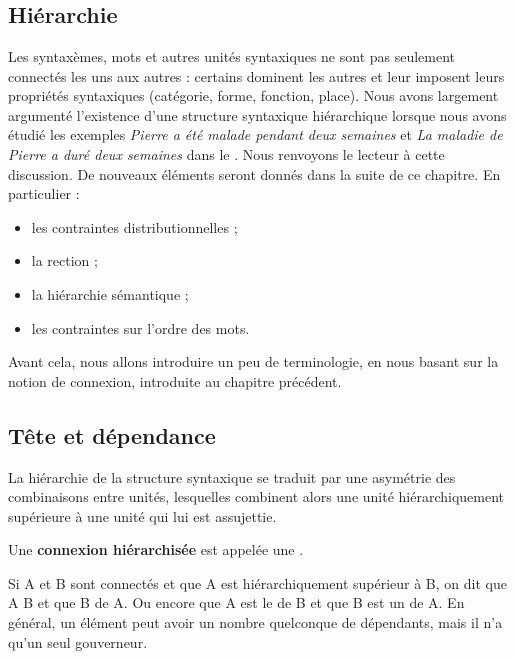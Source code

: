 \chapter{}\label{sec:3.3}

\section{Hiérarchie}\label{sec:3.3.0}

Les syntaxèmes, mots et autres unités syntaxiques ne sont pas seulement connectés les uns aux autres : certains dominent les autres et leur imposent leurs propriétés syntaxiques (catégorie, forme, fonction, place). Nous avons largement argumenté l’existence d’une structure syntaxique hiérarchique lorsque nous avons étudié les exemples \textit{Pierre a été malade pendant deux semaines} et \textit{La maladie de Pierre a duré deux semaines} dans le . Nous renvoyons le lecteur à cette discussion. De nouveaux éléments seront donnés dans la suite de ce chapitre. En particulier :

\begin{itemize}
\item les contraintes distributionnelles ;
\item la rection ;
\item la hiérarchie sémantique ;
\item les contraintes sur l’ordre des mots.
\end{itemize}

Avant cela, nous allons introduire un peu de terminologie, en nous basant sur la notion de connexion, introduite au chapitre précédent.

\section{Tête et dépendance}\label{sec:3.3.1}

La hiérarchie de la structure syntaxique se traduit par une asymétrie des combinaisons entre unités, lesquelles combinent alors une unité hiérarchiquement supérieure à une unité qui lui est assujettie.

\begin{styleLivreImportant}
Une \textbf{connexion hiérarchisée} est appelée une .
\end{styleLivreImportant}

\begin{styleLivreImportant}
Si A et B sont connectés et que A est hiérarchiquement supérieur à B, on dit que A  B et que B  de A. Ou encore que A est le  de B et que B est un  de A. En général, un élément peut avoir un nombre quelconque de dépendants, mais il n’a qu’un seul gouverneur.
\end{styleLivreImportant}

